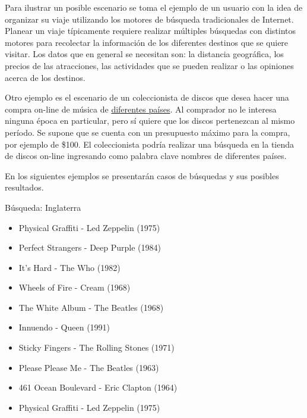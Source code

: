 Para ilustrar un posible escenario se toma el ejemplo de un usuario con la idea de organizar su viaje utilizando los motores de búsqueda tradicionales de Internet. Planear un viaje típicamente requiere realizar múltiples búsquedas con distintos motores para recolectar la información de los diferentes destinos que se quiere visitar. Los datos que en general se necesitan son: la distancia geográfica, los precios de las atracciones, las actividades que se pueden realizar o las opiniones acerca de los destinos.

Otro ejemplo es el escenario de un coleccionista de discos que desea hacer una compra on-line de música de \underline{diferentes países}. Al comprador no le interesa ninguna época en particular, pero sí quiere que los discos pertenezcan al mismo período. Se supone que se cuenta con un presupuesto máximo para la compra, por ejemplo de \$100. El coleccionista podría realizar una búsqueda en la tienda de discos on-line ingresando como palabra clave nombres de diferentes países. 

En los siguientes ejemplos se presentarán casos de búsquedas y sus posibles resultados.

\begin{mybox}{Búsqueda: Inglaterra}
\begin{itemize}
	\item {\scriptsize Physical Graffiti - Led Zeppelin (1975)}
	\item {\scriptsize Perfect Strangers - Deep Purple (1984)}
	\item {\scriptsize It's Hard - The Who  (1982)}
	\item {\scriptsize Wheels of Fire - Cream (1968)}
	\item {\scriptsize The White Album - The Beatles (1968)}
	\item {\scriptsize Innuendo - Queen (1991)}
	\item {\scriptsize Sticky Fingers - The Rolling Stones (1971)}
	\item {\scriptsize Please Please Me - The Beatles (1963)}
	\item {\scriptsize 461 Ocean Boulevard - Eric Clapton (1964)}
	\item {\scriptsize Physical Graffiti - Led Zeppelin (1975)}
\end{itemize}
\end{mybox}

